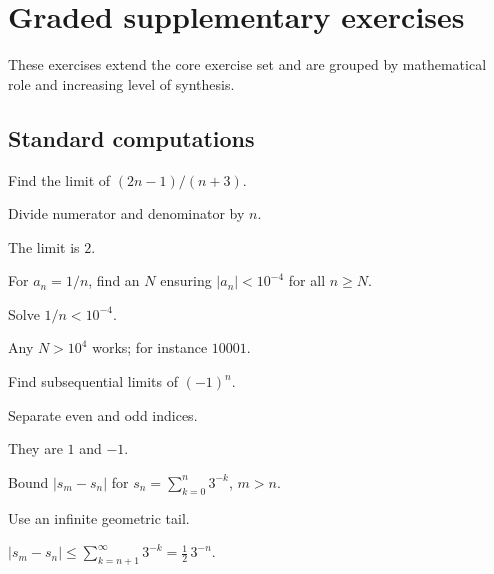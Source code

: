 \section{Graded supplementary exercises}
These exercises extend the core exercise set and are grouped by mathematical role and increasing level of synthesis.

\subsection*{Standard computations}

\begin{exercise}\label{exr:ii03-expand-01}
Find the limit of \((2n-1)/(n+3)\).
\end{exercise}
\begin{hint}
Divide numerator and denominator by \(n\).
\end{hint}
\begin{solution}
The limit is \(2\).
\end{solution}

\begin{exercise}[Choose N]\label{exr:ii03-expand-02}
For \(a_n=1/n\), find an \(N\) ensuring \(|a_n|<10^{-4}\) for all \(n\ge N\).
\end{exercise}
\begin{hint}
Solve \(1/n<10^{-4}\).
\end{hint}
\begin{solution}
Any \(N>10^4\) works; for instance \(10001\).
\end{solution}

\begin{exercise}\label{exr:ii03-expand-03}
Find subsequential limits of \((-1)^n\).
\end{exercise}
\begin{hint}
Separate even and odd indices.
\end{hint}
\begin{solution}
They are \(1\) and \(-1\).
\end{solution}

\begin{exercise}\label{exr:ii03-expand-04}
Bound \(|s_m-s_n|\) for \(s_n=\sum_{k=0}^n3^{-k}\), \(m>n\).
\end{exercise}
\begin{hint}
Use an infinite geometric tail.
\end{hint}
\begin{solution}
\(|s_m-s_n|\le \sum_{k=n+1}^\infty3^{-k}=\frac12\,3^{-n}\).
\end{solution}

